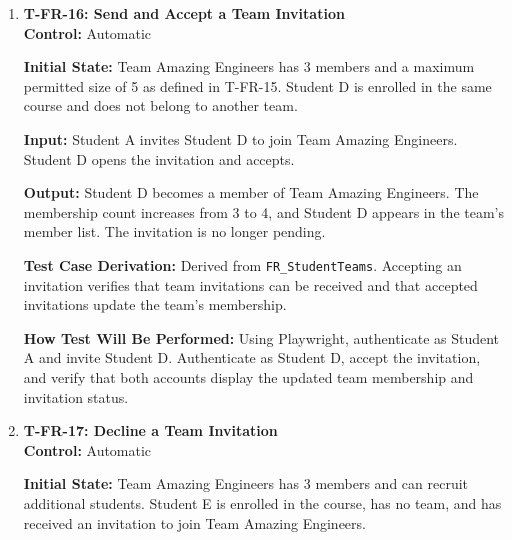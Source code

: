 \documentclass[12pt, titlepage]{article}
\begin{document}
\begin{enumerate}
\textbf{Output:} The team is created with the three students as members. Student A is identified as the point of contact, and the team membership and assigned roles are stored correctly.

\textbf{Test Case Derivation:} Derived from \texttt{FR\_StudentTeams}. Creating a team with a valid number of members and assigning a point of contact verifies that students can organize themselves into teams and define responsibilities.

\textbf{How Test Will Be Performed:} Configure the course team size limits and create the three student accounts. Using Playwright, create the team, complete the necessary membership invitations or confirmations, and assign the point-of-contact role. Verify the team membership and recorded role assignments.

\item \label{T-FR-16}\textbf{T-FR-16: Send and Accept a Team Invitation}\\

\textbf{Control:} Automatic

\textbf{Initial State:} Team Amazing Engineers has 3 members and a maximum permitted size of 5 as defined in T-FR-15. Student D is enrolled in the same course and does not belong to another team.

\textbf{Input:} Student A invites Student D to join Team Amazing Engineers. Student D opens the invitation and accepts.

\textbf{Output:} Student D becomes a member of Team Amazing Engineers. The membership count increases from 3 to 4, and Student D appears in the team's member list. The invitation is no longer pending.

\textbf{Test Case Derivation:} Derived from \texttt{FR\_StudentTeams}. Accepting an invitation verifies that team invitations can be received and that accepted invitations update the team's membership.

\textbf{How Test Will Be Performed:} Using Playwright, authenticate as Student A and invite Student D. Authenticate as Student D, accept the invitation, and verify that both accounts display the updated team membership and invitation status.

\item \label{T-FR-17}\textbf{T-FR-17: Decline a Team Invitation}\\

\textbf{Control:} Automatic

\textbf{Initial State:} Team Amazing Engineers has 3 members and can recruit additional students. Student E is enrolled in the course, has no team, and has received an invitation to join Team Amazing Engineers.


\end{enumerate}
\end{document}
